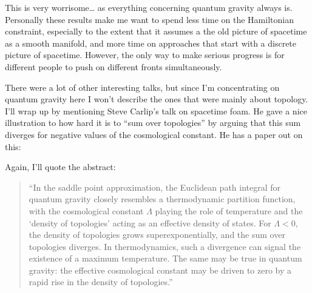 \documentclass{article}
\def\tightlist{}
\renewcommand{\texttt}[1]{%
  \begingroup
  \ttfamily
  \begingroup\lccode`~=`/\lowercase{\endgroup\def~}{/\discretionary{}{}{}}%
  \begingroup\lccode`~=`[\lowercase{\endgroup\def~}{[\discretionary{}{}{}}%
  \begingroup\lccode`~=`.\lowercase{\endgroup\def~}{.\discretionary{}{}{}}%
  \catcode`/=\active\catcode`[=\active\catcode`.=\active
  \scantokens{#1\noexpand}%
  \endgroup
}
\begin{document}

This is very worrisome\ldots{} as everything concerning quantum gravity
always is. Personally these results make me want to spend less time on
the Hamiltonian constraint, especially to the extent that it assumes a
the old picture of spacetime as a smooth manifold, and more time on
approaches that start with a discrete picture of spacetime. However, the
only way to make serious progress is for different people to push on
different fronts simultaneously.

There were a lot of other interesting talks, but since I'm concentrating
on quantum gravity here I won't describe the ones that were mainly about
topology. I'll wrap up by mentioning Steve Carlip's talk on spacetime
foam. He gave a nice illustration to how hard it is to ``sum over
topologies'' by arguing that this sum diverges for negative values of
the cosmological constant. He has a paper out on this:


Again, I'll quote the abstract:

\begin{quote}
``In the saddle point approximation, the Euclidean path integral for
quantum gravity closely resembles a thermodynamic partition function,
with the cosmological constant \(\Lambda\) playing the role of
temperature and the `density of topologies' acting as an effective
density of states. For \(\Lambda < 0\), the density of topologies grows
superexponentially, and the sum over topologies diverges. In
thermodynamics, such a divergence can signal the existence of a maximum
temperature. The same may be true in quantum gravity: the effective
cosmological constant may be driven to zero by a rapid rise in the
density of topologies.''
\end{quote}
\end{document}
